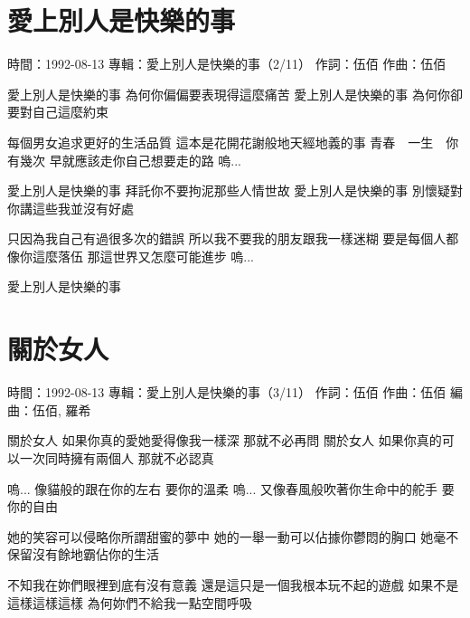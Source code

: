 \documentclass[UTF8,a4paper,oneside,twocolumn,12pt]{ctexbook}
\newcommand{\infopair}[2]{\textbullet #1：#2}
\newcommand{\zc}[1][伍佰]{\infopair{作詞}{#1}}
\newcommand{\zq}[1][伍佰]{\infopair{作曲}{#1}}
\newcommand{\bq}[1][伍佰]{\infopair{編曲}{#1}}
\newcommand{\zj}[1]{\infopair{專輯}{#1}}
\newcommand{\sj}[1]{\infopair{時間}{#1}}
\newenvironment{info}{\begin{flushleft}\kaishu
	}
	{\end{flushleft}\normalsize\yahei\par}
\newenvironment{lyric}{
	}
{}
\begin{document}
\section{愛上別人是快樂的事}
\begin{info}
	\sj{1992-08-13}
	\zj{愛上別人是快樂的事（2/11）}
	\zc
	\zq
\end{info}
\begin{lyric}
	愛上別人是快樂的事
	為何你偏偏要表現得這麼痛苦
	愛上別人是快樂的事
	為何你卻要對自己這麼約束

	每個男女追求更好的生活品質
	這本是花開花謝般地天經地義的事
	青春　一生　你有幾次
	早就應該走你自己想要走的路
	嗚...

	愛上別人是快樂的事
	拜託你不要拘泥那些人情世故
	愛上別人是快樂的事
	別懷疑對你講這些我並沒有好處

	只因為我自己有過很多次的錯誤
	所以我不要我的朋友跟我一樣迷糊
	要是每個人都像你這麼落伍
	那這世界又怎麼可能進步
	嗚...

	愛上別人是快樂的事
\end{lyric}

\section{關於女人}
\begin{info}
	\sj{1992-08-13}
	\zj{愛上別人是快樂的事（3/11）}
	\zc
	\zq
	\bq[伍佰, 羅希]
\end{info}
\begin{lyric}
	關於女人
	如果你真的愛她愛得像我一樣深
	那就不必再問
	關於女人
	如果你真的可以一次同時擁有兩個人
	那就不必認真

	嗚...
	像貓般的跟在你的左右
	要你的溫柔
	嗚...
	又像春風般吹著你生命中的舵手
	要你的自由

	她的笑容可以侵略你所謂甜蜜的夢中
	她的一舉一動可以佔據你鬱悶的胸口
	她毫不保留沒有餘地霸佔你的生活

	不知我在妳們眼裡到底有沒有意義
	還是這只是一個我根本玩不起的遊戲
	如果不是這樣這樣這樣
	為何妳們不給我一點空間呼吸
\end{lyric}
\end{document}
